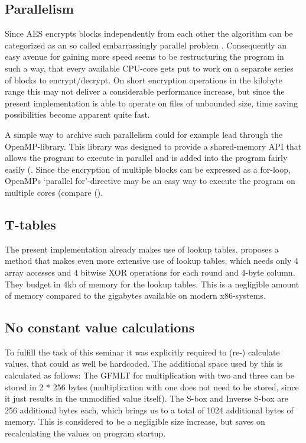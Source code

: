 \hypertarget{parallelism}{%
\subsection{Parallelism}\label{parallelism}}

Since AES encrypts blocks independently from each other the algorithm
can be categorized as an so called embarrassingly parallel problem
\cite[p.48]{parallelprog}. Consequently an easy avenue for gaining more
speed seems to be restructuring the program in such a way, that every
available CPU-core gets put to work on a separate series of blocks to
encrypt/decrypt. On short encryption operations in the kilobyte range
this may not deliver a considerable performance increase, but since the
present implementation is able to operate on files of unbounded size,
time saving possibilities become apparent quite fast.

A simple way to archive such parallelism could for example lead through
the OpenMP-library. This library was designed to provide a shared-memory
API that allows the program to execute in parallel and is added into the
program fairly easily (\cite[ch. 5]{parallelprog}. Since the encryption of
multiple blocks can be expressed as a for-loop, OpenMPs `parallel
for'-directive may be an easy way to execute the program on multiple
cores (compare (\cite[ch. 5.5]{parallelprog}).

\hypertarget{t-tables}{%
\subsection{T-tables}\label{t-tables}}

The present implementation already makes use of lookup tables. \cite[p. 59]{rijndael} proposes a method that makes even more extensive use of lookup
tables, which needs only 4 array accesses and 4 bitwise XOR operations
for each round and 4-byte column. They budget in 4kb of memory for the
lookup tables. This is a negligible amount of memory compared to the
gigabytes available on modern x86-systems.

\hypertarget{no-constant-value-calculations}{%
\subsection{No constant value
calculations}\label{no-constant-value-calculations}}

To fulfill the task of this seminar it was explicitly required to (re-)
calculate values, that could as well be hardcoded. The additional space
used by this is calculated as follows: The GFMLT for multiplication with
two and three can be stored in 2 * 256 bytes (multiplication with one
does not need to be stored, since it just results in the unmodified
value itself). The S-box and Inverse S-box are 256 additional bytes
each, which brings us to a total of 1024 additional bytes of memory.
This is considered to be a negligible size increase, but saves on
recalculating the values on program startup.

